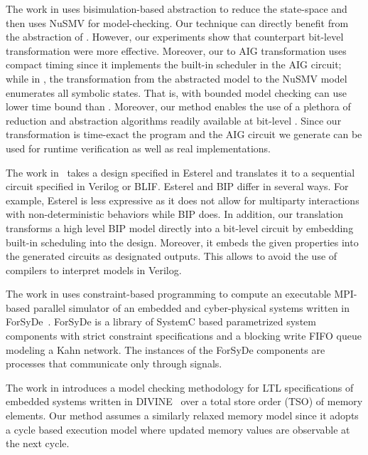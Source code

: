 The work in \cite{facs14} uses bisimulation-based abstraction to reduce the state-space and then uses NuSMV for model-checking. Our technique can directly benefit from the abstraction of \cite{facs14}. However, our experiments show that counterpart bit-level transformation were more effective. Moreover, our \caig to AIG transformation uses compact timing since it implements the built-in scheduler in the AIG circuit; while in \cite{facs14}, the transformation from the abstracted model to the NuSMV model enumerates all symbolic states. That is, with \biptool{} bounded model checking can use lower time bound than \cite{facs14}. Moreover, our method enables the use of a plethora of reduction and abstraction algorithms readily available at bit-level \cite{brayton2010abc}. 
Since our transformation is time-exact the \caig program and the AIG circuit we generate can be used for runtime verification as well as real implementations. 


The work in~\cite{CompilingEsterel} takes a design specified in Esterel
and translates it to a sequential circuit specified in Verilog or BLIF. 
%
%
Esterel and BIP differ in several ways.
For example, Esterel is less expressive as it does not allow for multiparty
interactions with non-deterministic behaviors while BIP does.
%
In addition,
our translation transforms a high level BIP model directly into a
bit-level circuit by embedding built-in scheduling into
the design.
Moreover, it embeds the given properties into the
generated circuits as designated outputs.
This allows to avoid the use of compilers to interpret
models in Verilog.

   

The work in \cite{NiakiDATAS13} uses constraint-based
programming to compute an executable 
MPI-based parallel simulator of an embedded and cyber-physical 
systems written in ForSyDe~\cite{SanderJ04}.
ForSyDe is a library of SystemC based 
parametrized system components with strict constraint 
specifications and a blocking write FIFO queue modeling 
a Kahn network. 
The instances of the ForSyDe components are processes that 
communicate only through signals. 

The work in \cite{BarnatVMCAI2013} introduces a model checking
methodology for LTL specifications of embedded systems written 
in DIVINE~\cite{Divine}  over
a total store order (TSO) of memory elements. 
Our method assumes a similarly relaxed memory model
since it adopts a cycle based execution model where 
updated memory values are observable at the next cycle. 

